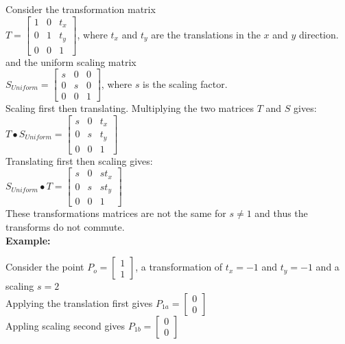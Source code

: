 \documentclass[a4paper,10pt]{scrartcl}
\begin{document}
Consider the transformation matrix \\

$T = 
\begin{bmatrix}
    1       & 0 & t_x \\
    0       & 1 & t_y \\
    0       & 0 & 1 
\end{bmatrix}
$, where $t_x $ and $t_y$ are the translations in the $x$ and $y$ direction. \\

and the uniform scaling matrix \\

$S_{Uniform} = \begin{bmatrix}
    s       & 0 & 0 \\
    0       & s & 0 \\
    0       & 0 & 1     
 \end{bmatrix}
$, where $s$ is the scaling factor. \\

Scaling first then translating. Multiplying the two matrices $T$ and $S$ gives: \\

$T \bullet S_{Uniform} = \begin{bmatrix}
		  s & 0 & t_x \\
		  0 & s & t_y \\
		  0 & 0 & 1
               \end{bmatrix}
$ \\

Translating first then scaling gives: \\

$S_{Uniform} \bullet T = \begin{bmatrix}
		  s & 0 & st_x \\
		  0 & s & st_y \\
		  0 & 0 & 1
               \end{bmatrix}
$ \\ 

These transformations matrices are not the same for $s \neq 1$ and thus the transforms do not commute. \\ 

{\bfseries{Example:}}

Consider the point $P_o = \begin{bmatrix} 1 \\ 1 \end{bmatrix}$, a transformation of $t_x = -1$ and $t_y = -1$ and a scaling $s = 2$\\
Applying the translation first gives $P_{1a} = \begin{bmatrix} 0 \\ 0 \end{bmatrix}$ \\ 
Appling scaling second gives $P_{1b} = \begin{bmatrix} 0 \\ 0 \end{bmatrix}$
\end{document}

